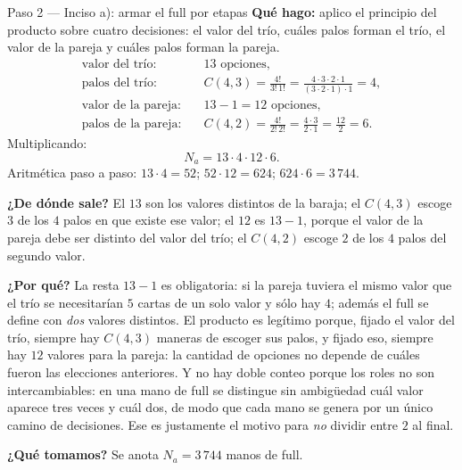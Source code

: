\documentclass[11pt]{article}
\begin{document}
\begin{paso}{Paso 2 --- Inciso a): armar el full por etapas}
\textbf{Qué hago:} aplico el principio del producto sobre cuatro decisiones: el valor del trío, cuáles palos forman el trío, el valor de la pareja y cuáles palos forman la pareja.
\begin{align*}
  \text{valor del trío:}&\quad 13 \text{ opciones},\\
  \text{palos del trío:}&\quad C(4,3)=\frac{4!}{3!\,1!}=\frac{4\cdot 3\cdot 2\cdot 1}{(3\cdot 2\cdot 1)\cdot 1}=4,\\
  \text{valor de la pareja:}&\quad 13-1=12 \text{ opciones},\\
  \text{palos de la pareja:}&\quad C(4,2)=\frac{4!}{2!\,2!}=\frac{4\cdot 3}{2\cdot 1}=\frac{12}{2}=6 .
\end{align*}
Multiplicando:
\[
  N_a = 13\cdot 4\cdot 12\cdot 6 .
\]
Aritmética paso a paso: $13\cdot 4=52$; $52\cdot 12=624$; $624\cdot 6=3\,744$.

\textbf{¿De dónde sale?} El $13$ son los valores distintos de la baraja; el $C(4,3)$ escoge $3$ de los $4$ palos en que existe ese valor; el $12$ es $13-1$, porque el valor de la pareja debe ser distinto del valor del trío; el $C(4,2)$ escoge $2$ de los $4$ palos del segundo valor.

\textbf{¿Por qué?} La resta $13-1$ es obligatoria: si la pareja tuviera el mismo valor que el trío se necesitarían $5$ cartas de un solo valor y sólo hay $4$; además el full se define con \emph{dos} valores distintos. El producto es legítimo porque, fijado el valor del trío, siempre hay $C(4,3)$ maneras de escoger sus palos, y fijado eso, siempre hay $12$ valores para la pareja: la cantidad de opciones no depende de cuáles fueron las elecciones anteriores. Y no hay doble conteo porque los roles no son intercambiables: en una mano de full se distingue sin ambigüedad cuál valor aparece tres veces y cuál dos, de modo que cada mano se genera por un único camino de decisiones. Ese es justamente el motivo para \emph{no} dividir entre $2$ al final.

\textbf{¿Qué tomamos?} Se anota $N_a=3\,744$ manos de full.
\end{paso}
\end{document}
